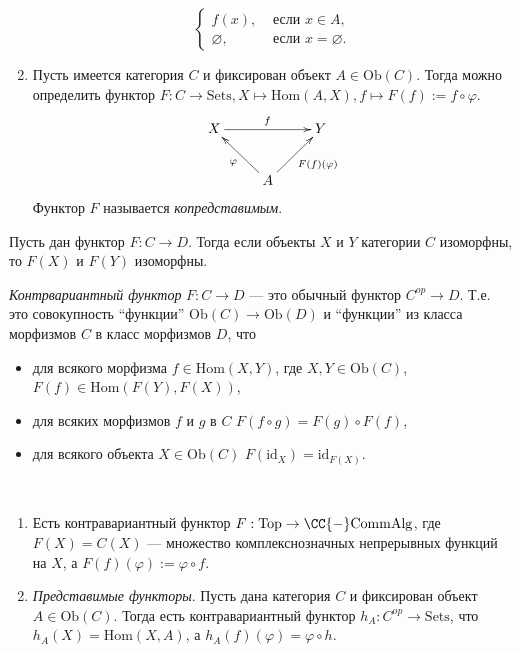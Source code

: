\documentclass[12pt,a4paper]{article}
\newcommand{\Hom}{\mathrm{Hom}}
\newcommand{\Ob}{\mathrm{Ob}}
\newcommand{\id}{\mathrm{id}}
\newcommand{\Sets}{\mathrm{Sets}}
\newcommand{\Comm}{\mathrm{Comm}}
\newcommand{\Top}{\mathrm{Top}}
\newcommand{\Alg}{\mathrm{Alg}}
\begin{document}
\begin{example}
\begin{enumerate}
\[                    \begin{cases}
                        f(x),& \text{ если } x \in A,\\
                        \varnothing,& \text{ если } x = \varnothing.
                    \end{cases}
                \]
            \item Пусть имеется категория $C$ и фиксирован объект $A \in \Ob(C)$. Тогда можно определить функтор $F: C \to \Sets, X \mapsto \Hom(A, X), f \mapsto F(f) := f \circ \varphi$.
                \[
                    \xymatrix{
                        X \ar[rr]^{f} && Y\\
                        & A \ar[ul]^{\varphi} \ar[ur]_{F(f)(\varphi)}
                    }
                \]
                Функтор $F$ называется \emph{копредставимым}.
        \end{enumerate}
    \end{example}

    \begin{lemma}
        Пусть дан функтор $F: C \to D$. Тогда если объекты $X$ и $Y$ категории $C$ изоморфны, то $F(X)$ и $F(Y)$ изоморфны.
    \end{lemma}

    \begin{definition}
        \emph{Контрвариантный функтор} $F: C \to D$ --- это обычный функтор $C^{op} \to D$. Т.е. это совокупность ``функции'' $\Ob(C) \to \Ob(D)$ и ``функции'' из класса морфизмов $C$ в класс морфизмов $D$, что
        \begin{itemize}
            \item для всякого морфизма $f \in \Hom(X, Y)$, где $X, Y \in \Ob(C)$, $F(f) \in \Hom(F(Y), F(X))$,
            \item для всяких морфизмов $f$ и $g$ в $C$ $F(f \circ g) = F(g) \circ F(f)$,
            \item для всякого объекта $X \in \Ob(C)$ $F(\id_X) = \id_{F(X)}$.
        \end{itemize}
    \end{definition}

    \begin{example}\ 
        \begin{enumerate}
            \item Есть контравариантный функтор $F: \Top \to \CC{-}\Comm\Alg$, где $F(X) = C(X)$ --- множество комплекснозначных непрерывных функций на $X$, а $F(f)(\varphi) := \varphi \circ f$.
            \item \emph{Представимые функторы}. Пусть дана категория $C$ и фиксирован объект $A \in \Ob(C)$. Тогда есть контравариантный функтор $h_A: C^{op} \to \Sets$, что $h_A(X) = \Hom(X, A)$, а $h_A(f)(\varphi) = \varphi \circ h$. 
        \end{enumerate}
    \end{example}
\end{document}
